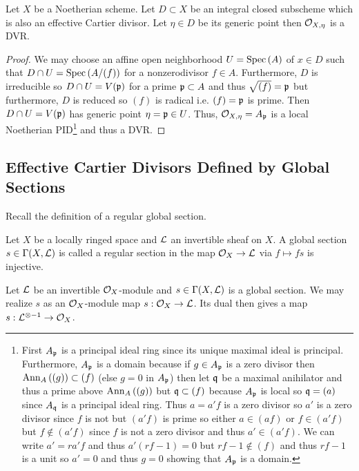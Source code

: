 \documentclass[12pt]{article}
\begin{document}
\begin{lemma}
Let $X$ be a Noetherian scheme. Let $D \subset X$ be an integral closed subscheme which is also an effective Cartier divisor. Let $\eta \in D$ be its generic point then $\mathcal{O}_{X, \eta}$ is a DVR.
\end{lemma}

\begin{proof}
We may choose an affine open neighborhood $U = \mathrm{Spec}\left( A \right)$ of $x \in D$ such that $D \cap U = \mathrm{Spec}\left( A / (f) \right)$ for a nonzerodivisor $f \in A$. Furthermore, $D$ is irreducible so $D \cap U = V(\mathfrak{p})$ for a prime $\mathfrak{p} \subset A$ and thus $\sqrt{(f)} = \mathfrak{p}$ but furthermore, $D$ is reduced so $(f)$ is radical i.e. $(f) = \mathfrak{p}$ is prime. Then $D \cap U = V(\mathfrak{p})$ has generic point $\eta = \mathfrak{p} \in U$. Thus, $\mathcal{O}_{X, \eta} = A_{\mathfrak{p}}$ is a local Noetherian PID\footnote{First $A_{\mathfrak{p}}$ is a principal ideal ring since its unique maximal ideal is principal. Furthermore, $A_{\mathfrak{p}}$ is a domain because if $g \in A_{\mathfrak{p}}$ is a zero divisor then $\mathrm{Ann}_{A}\left((g)\right) \subset (f)$ (else $g = 0$ in $A_{\mathfrak{p}}$) then let $\mathfrak{q}$ be a maximal anihilator and thus a prime above $\mathrm{Ann}_{A}\left((g)\right)$ but $\mathfrak{q} \subset (f)$ because $A_{\mathfrak{p}}$ is local so $\mathfrak{q} = (a)$ since $A_{\mathfrak{q}}$ is a principal ideal ring. Thus $a = a'f$ is a zero divisor so $a'$ is a zero divisor since $f$ is not but $(a'f)$ is prime so either $a \in (af)$ or $f \in (a'f)$ but $f \notin (a'f)$ since $f$ is not a zero divisor and thus $a' \in (a'f)$. We can write $a' = r a' f$ and thus $a' (rf - 1) = 0$ but $rf - 1 \notin (f)$ and thus $rf - 1$ is a unit so $a' = 0$ and thus $g = 0$ showing that $A_{\mathfrak{p}}$ is a domain.} and thus a DVR.
\end{proof}


\subsection{Effective Cartier Divisors Defined by Global Sections}

\begin{rmk}
Recall the definition of a regular global section.
\end{rmk}

\begin{definition}
Let $X$ be a locally ringed space and $\mathcal{L}$ an invertible sheaf on $X$. A global section $s \in \Gamma(X, \mathcal{L})$ is called a regular section in the map $\mathcal{O}_{X} \to \mathcal{L}$ via $f \mapsto fs$ is injective.
\end{definition}

\begin{remark}
Let $\mathcal{L}$ be an invertible $\mathcal{O}_{X}$-module and $s \in \Gamma(X, \mathcal{L})$ is a global section. We may realize $s$ as an $\mathcal{O}_{X}$-module map $s : \mathcal{O}_{X} \to \mathcal{L}$. Its dual then gives a map $s : \mathcal{L}^{\otimes - 1} \to \mathcal{O}_{X}$. 
\end{remark}
\end{document}
